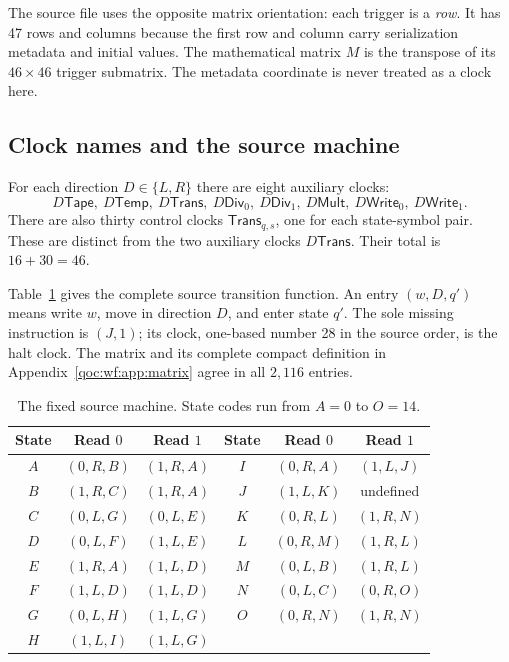 \documentclass[11pt,letterpaper]{article}
\theoremstyle{definition}
\theoremstyle{remark}
\newcommand{\clk}[1]{\mathsf{#1}}
\begin{document}
The source file uses the opposite matrix orientation: each trigger is a \emph{row}. It has 47 rows and columns because the first row and column carry serialization metadata and initial values. The mathematical matrix $M$ is the transpose of its $46\times46$ trigger submatrix. The metadata coordinate is never treated as a clock here.

\subsection{Clock names and the source machine}
For each direction $D\in\{L,R\}$ there are eight auxiliary clocks:
\[
 D\clk{Tape},\ D\clk{Temp},\ D\clk{Trans},\ D\clk{Div}_0,\ D\clk{Div}_1,
 \ D\clk{Mult},\ D\clk{Write}_0,\ D\clk{Write}_1.
\]
There are also thirty control clocks $\clk{Trans}_{q,s}$, one for each state-symbol pair. These are distinct from the two auxiliary clocks $D\clk{Trans}$. Their total is $16+30=46$.

Table~\ref{qoc:wf:tab:tm} gives the complete source transition function. An entry $(w,D,q')$ means write $w$, move in direction $D$, and enter state $q'$. The sole missing instruction is $(J,1)$; its clock, one-based number 28 in the source order, is the halt clock. The matrix and its complete compact definition in Appendix~\ref{qoc:wf:app:matrix} agree in all $2{,}116$ entries.

\begin{table}[htbp]
\centering
\caption{The fixed source machine. State codes run from $A=0$ to $O=14$.}\label{qoc:wf:tab:tm}
\begin{tabular}{@{}c cc @{
\qquad}c cc@{}}
\toprule
State & Read $0$ & Read $1$ & State & Read $0$ & Read $1$\\\midrule
$A$ & $(0,R,B)$ & $(1,R,A)$ & $I$ & $(0,R,A)$ & $(1,L,J)$\\
$B$ & $(1,R,C)$ & $(1,R,A)$ & $J$ & $(1,L,K)$ & undefined\\
$C$ & $(0,L,G)$ & $(0,L,E)$ & $K$ & $(0,R,L)$ & $(1,R,N)$\\
$D$ & $(0,L,F)$ & $(1,L,E)$ & $L$ & $(0,R,M)$ & $(1,R,L)$\\
$E$ & $(1,R,A)$ & $(1,L,D)$ & $M$ & $(0,L,B)$ & $(1,R,L)$\\
$F$ & $(1,L,D)$ & $(1,L,D)$ & $N$ & $(0,L,C)$ & $(0,R,O)$\\
$G$ & $(0,L,H)$ & $(1,L,G)$ & $O$ & $(0,R,N)$ & $(1,R,N)$\\
$H$ & $(1,L,I)$ & $(1,L,G)$ & & &\\\bottomrule
\end{tabular}
\end{table}
\end{document}

